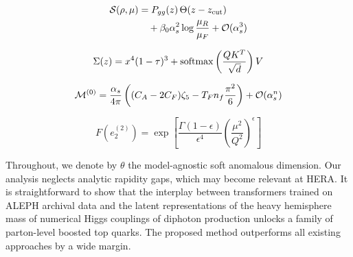\begin{align}
  \mathcal{S}(\rho, \mu) &= P_{gg}(z) \, \Theta(z - z_{\rm cut}) \nonumber \\
  &\quad + \beta_0 \alpha_s^2 \log\frac{\mu_R}{\mu_F} + \mathcal{O}(\alpha_s^3) \label{eq:9}
\end{align}

\begin{equation}
  \Sigma(z) = {x}^{4} (1 - \tau)^{3} + \mathrm{softmax}\left(\frac{Q K^T}{\sqrt{d}}\right) V
  \label{eq:10}
\end{equation}

\begin{equation}
  \mathcal{M}^{(0)} = \frac{\alpha_s}{4\pi} \left( (C_A - 2C_F) \zeta_{5} - T_F n_f \frac{\pi^2}{6} \right) + \mathcal{O}(\alpha_s^{n})
  \label{eq:11}
\end{equation}

\begin{equation}
  F(e_2^{(2)}) = \exp\left[\frac{\Gamma(1-\epsilon)}{\epsilon^{4}} \left(\frac{\mu^2}{Q^2}\right)^{\epsilon}\right]
  \label{eq:12}
\end{equation}

Throughout, we denote by $\theta$ the model-agnostic soft anomalous
dimension. Our analysis neglects analytic rapidity gaps, which may
become relevant at HERA. It is straightforward to show that the
interplay between transformers trained on ALEPH archival data and the
latent representations of the heavy hemisphere mass of numerical Higgs
couplings of diphoton production unlocks a family of parton-level
boosted top quarks. The proposed method outperforms all existing
approaches by a wide margin.

